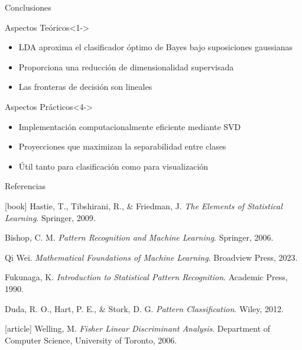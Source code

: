 \documentclass[spanish,handout]{beamer}
\begin{document}
\begin{frame}{Conclusiones}
\begin{block}{Aspectos Teóricos}<1->
\begin{itemize}[<+->]
    \item LDA aproxima el clasificador óptimo de Bayes bajo suposiciones gaussianas
    \item Proporciona una reducción de dimensionalidad supervisada
    \item Las fronteras de decisión son lineales
\end{itemize}
\end{block}

\begin{block}{Aspectos Prácticos}<4->
\begin{itemize}[<+->]
    \item Implementación computacionalmente eficiente mediante SVD
    \item Proyecciones que maximizan la separabilidad entre clases
    \item Útil tanto para clasificación como para visualización
\end{itemize}
\end{block}
\end{frame}

\begin{frame}{Referencias}
\fontsize{7pt}{10pt}\selectfont
\begin{thebibliography}{99}
[book]
 Hastie, T., Tibshirani, R., \& Friedman, J.
\newblock \emph{The Elements of Statistical Learning}.
\newblock Springer, 2009.

 Bishop, C. M.
\newblock \emph{Pattern Recognition and Machine Learning}.
\newblock Springer, 2006.

 Qi Wei.
\newblock \emph{Mathematical Foundations of Machine Learning}.
\newblock Broadview Press, 2023.

 Fukunaga, K.
\newblock \emph{Introduction to Statistical Pattern Recognition}.
\newblock Academic Press, 1990.

 Duda, R. O., Hart, P. E., \& Stork, D. G.
\newblock \emph{Pattern Classification}.
\newblock Wiley, 2012.

[article]
 Welling, M.
\newblock \emph{Fisher Linear Discriminant Analysis}.
\newblock Department of Computer Science, University of Toronto, 2006.
\end{thebibliography}
\end{frame}
\end{document}
